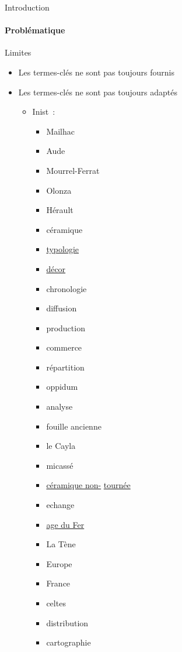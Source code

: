 \begin{frame}{Introduction}\framesubtitle{Problématique}
  \begin{alertblock}{Limites}
    \begin{itemize}
      \item{Les termes-clés ne sont pas toujours fournis}
      \item{Les termes-clés ne sont pas toujours adaptés}
      \begin{itemize}
        \item{Inist~:}
        \vspace{-1em}
        \begin{multicols}{3}
          \begin{itemize}
            \item{Mailhac}
            \item{Aude}
            \item{Mourrel-Ferrat}
            \item{Olonza}
            \item{Hérault}
            \item{céramique}
            \item{\underline{typologie}}
            \item{\underline{décor}}
            \item{chronologie}
            \item{diffusion}
            \item{production}
            \item{commerce}
            \item{répartition}
            \item{oppidum}
            \item{analyse}
            \item{fouille ancienne}
            \item{le Cayla}
            \item{micassé}
            \item{\underline{céramique non-} \underline{tournée}}
            \item{echange}
            \item{\underline{age du Fer}}
            \item{La Tène}
            \item{Europe}
            \item{France}
            \item{celtes}
            \item{distribution}
            \item{cartographie}

\end{itemize}
\end{multicols}
\end{itemize}
\end{itemize}
\end{alertblock}
\end{frame}
